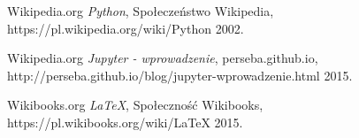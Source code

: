 \documentclass{article}
\begin{document}
  \begin{thebibliography}{9}

  Wikipedia.org
  \textit{ Python},
  Społeczeństwo Wikipedia,
  https://pl.wikipedia.org/wiki/Python
  2002.

  Wikipedia.org
  \textit{Jupyter - wprowadzenie},
  perseba.github.io,
  http://perseba.github.io/blog/jupyter-wprowadzenie.html
  2015.

  Wikibooks.org
  \textit{LaTeX},
  Społeczność Wikibooks,
  https://pl.wikibooks.org/wiki/LaTeX
  2015.


\end{thebibliography}
\end{document}
